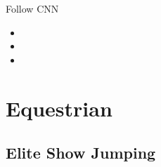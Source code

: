 Follow CNN

\begin{itemize}
\item
\item
\item
\end{itemize}

\hypertarget{equestrian}{%
\section{Equestrian}\label{equestrian}}

\hypertarget{elite-show-jumping-}{%
\subsection{Elite Show Jumping~}\label{elite-show-jumping-}}

